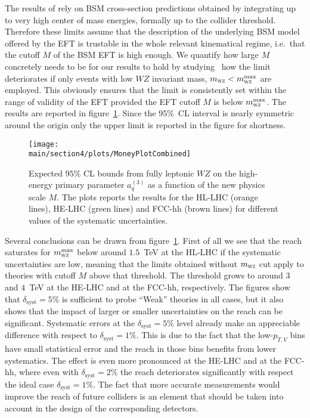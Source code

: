 The results of   rely on BSM cross-section predictions obtained by integrating up to very high center of mass energies, formally up to the collider threshold. Therefore these limits assume that the description of the underlying BSM model offered by the EFT is trustable in the whole relevant kinematical regime, i.e.~that the cutoff $M$ of the BSM EFT is high enough. We quantify how large $M$ concretely needs to be for our results to hold by studying~\cite{Racco:2015dxa,Pobbe:2017wrj,Biekoetter:2014jwa} how the limit deteriorates if only events with low $WZ$ invariant mass, $m_{\textsc{wz}}<m_{\textsc{wz}}^{\rm{max}}$ are employed. This obviously ensures that the limit is consistently set within the range of validity of the EFT provided the EFT cutoff $M$ is below $m_{\textsc{wz}}^{\rm{max}}$. The results are reported in figure~\ref{fig:bounds_future}. Since the $95\%$~CL interval is nearly symmetric around the origin only the upper limit is reported in the figure for shortness.

\begin{figure}[t]
\centering
\texttt{[image: \\main/section4/plots/MoneyPlotCombined]}
\caption{Expected $95\%$ CL bounds from fully leptonic $WZ$ on the high-energy primary parameter $a^{(3)}_q$ as a function of the new physics scale $M$. The plots reports the results for the HL-LHC (orange lines), HE-LHC (green lines) and FCC-hh (brown lines) for different
values of the systematic uncertainties.} 
\label{fig:bounds_future}
\end{figure}

Several conclusions can be drawn from figure~\ref{fig:bounds_future}. First of all we see that the reach saturates for $m_{\textsc{wz}}^{\rm{max}}$ below around $1.5$~TeV at the HL-LHC if the systematic uncertainties are low, meaning that the limits obtained without $m_{\textsc{wz}}$ cut apply to theories with cutoff $M$ above that threshold.  The threshold grows to around $3$ and $4$~TeV at the HE-LHC and at the FCC-hh, respectively. The figures show that $\delta_{\textrm{syst}}=5\%$ is sufficient to probe ``Weak'' theories in all cases, but it also shows that the impact of larger or smaller uncertainties on the reach can be significant. Systematic errors at the $\delta_{\textrm{syst}}=5\%$ level already make an appreciable difference with respect to $\delta_{\textrm{syst}}=1\%$. This is due to the fact that the low-$p_{T,V}$ bins have small statistical error and the reach in those bins benefits from lower systematics. The effect is even more pronounced at the HE-LHC and at the FCC-hh, where even with $\delta_{\textrm{syst}}=2\%$ the reach deteriorates significantly with respect the ideal case $\delta_{\textrm{syst}}=1\%$. The fact that more accurate measurements would improve the reach of future colliders is an element that should be taken into account in the design of the corresponding detectors.

